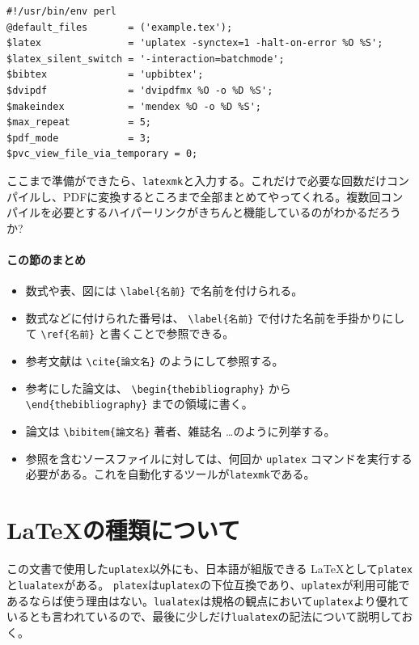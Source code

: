 \begin{reidai}
    \begin{verbatim}
#!/usr/bin/env perl
@default_files       = ('example.tex');
$latex               = 'uplatex -synctex=1 -halt-on-error %O %S';
$latex_silent_switch = '-interaction=batchmode';
$bibtex              = 'upbibtex';
$dvipdf              = 'dvipdfmx %O -o %D %S';
$makeindex           = 'mendex %O -o %D %S';
$max_repeat          = 5;
$pdf_mode            = 3;
$pvc_view_file_via_temporary = 0;
\end{verbatim}
\end{reidai}

ここまで準備ができたら、\texttt{latexmk}と入力する。これだけで必要な回数だけコンパイルし、PDFに変換するところまで全部まとめてやってくれる。複数回コンパイルを必要とするハイパーリンクがきちんと機能しているのがわかるだろうか?

\paragraph{この節のまとめ}

\begin{itemize}
    \item 数式や表、図には \verb|\label{名前}| で名前を付けられる。
    \item 数式などに付けられた番号は、 \verb|\label{名前}| で付けた名前を手掛かりにして \verb|\ref{名前}| と書くことで参照できる。
    \item 参考文献は \verb|\cite{論文名}| のようにして参照する。
    \item 参考にした論文は、 \verb|\begin{thebibliography}| から
          \verb|\end{thebibliography}| までの領域に書く。
    \item 論文は \verb|\bibitem{論文名}| 著者、雑誌名 \dots のように列挙する。
    \item 参照を含むソースファイルに対しては、何回か \texttt{uplatex} コマンドを実行する必要がある。これを自動化するツールが\texttt{latexmk}である。
\end{itemize}

\section{\LaTeX の種類について}
この文書で使用した\texttt{uplatex}以外にも、日本語が組版できる \LaTeX として\texttt{platex}と\texttt{lualatex}がある。
\texttt{platex}は\texttt{uplatex}の下位互換であり、\texttt{uplatex}が利用可能であるならば使う理由はない。\texttt{lualatex}は規格の観点において\texttt{uplatex}より優れているとも言われているので、最後に少しだけ\texttt{lualatex}の記法について説明しておく。

